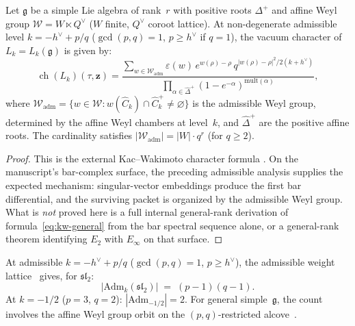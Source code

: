 \begin{theorem}
\label{thm:kw-bar-general-rank}
Let $\mathfrak{g}$ be a simple Lie algebra of rank~$r$ with
positive roots $\Delta^+$ and affine Weyl group
$\mathcal{W} = W \ltimes Q^\vee$ \textup{(}$W$ finite,
$Q^\vee$ coroot lattice\textup{)}. At non-degenerate
admissible level $k = -h^\vee + p/q$ \textup{(}$\gcd(p,q) = 1$,
$p \geq h^\vee$ if $q = 1$\textup{)}, the vacuum character of
$L_k = L_k(\mathfrak{g})$ is given by\textup{:}
\begin{equation}\label{eq:kw-general}
\operatorname{ch}(L_k)(\tau, \mathbf{z})
= \frac{\sum_{w \in \mathcal{W}_{\mathrm{adm}}}
 \varepsilon(w)\, e^{w(\rho) - \rho}\,
 q^{|w(\rho) - \rho|^2 / 2(k + h^\vee)}}
{\prod_{\alpha \in \hat{\Delta}^+}
 (1 - e^{-\alpha})^{\mathrm{mult}(\alpha)}},
\end{equation}
where $\mathcal{W}_{\mathrm{adm}} = \{w \in \mathcal{W}
: w(\hat{C}_k) \cap \hat{C}_k^+ \neq \varnothing\}$ is
the admissible Weyl group, determined by the affine Weyl
chambers at level~$k$, and $\hat{\Delta}^+$ are the
positive affine roots. The cardinality satisfies
$|\mathcal{W}_{\mathrm{adm}}| = |W| \cdot q^r$
\textup{(}for $q \geq 2$\textup{)}.
\end{theorem}

\begin{proof}
This is the external Kac--Wakimoto character formula
\cite{KW88}. On the manuscript's bar-complex surface, the
preceding admissible analysis supplies the expected mechanism:
singular-vector embeddings produce the first bar differential,
and the surviving packet is organized by the admissible Weyl
group. What is \emph{not} proved here is a full internal
general-rank derivation of formula~\eqref{eq:kw-general} from the
bar spectral sequence alone, or a general-rank theorem identifying
$E_2$ with $E_\infty$ on that surface.
\end{proof}

\begin{remark}
\label{rem:admissible-module-count}
At admissible $k = -h^\vee + p/q$ ($\gcd(p,q) = 1$, $p \geq h^\vee$),
the admissible weight lattice~\cite{KW88} gives, for
$\mathfrak{sl}_2$:
\[
\bigl|\mathrm{Adm}_k(\mathfrak{sl}_2)\bigr|
\;=\; (p-1)(q-1).
\]
At $k = -1/2$ ($p = 3$, $q = 2$): $|\mathrm{Adm}_{-1/2}| = 2$. For general simple~$\mathfrak{g}$, the count involves the affine Weyl group orbit on the $(p,q)$-restricted alcove~\cite{KW88}.
\end{remark}

